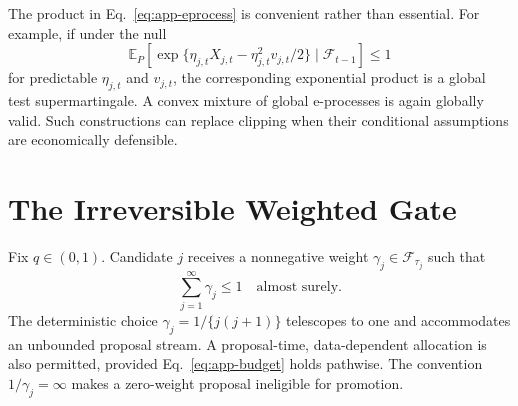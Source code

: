 The product in Eq.~\eqref{eq:app-eprocess} is convenient rather than
essential.  For example, if under the null
\[
 \mathbb E_P[
   \exp\{\eta_{j,t}X_{j,t}-\eta_{j,t}^2v_{j,t}/2\}
   \mid\mathcal F_{t-1}]\leq1
\]
for predictable \(\eta_{j,t}\) and \(v_{j,t}\), the corresponding
exponential product is a global test supermartingale.  A convex mixture of
global e-processes is again globally valid.  Such constructions can replace
clipping when their conditional assumptions are economically defensible.

\section{The Irreversible Weighted Gate}
\label{app:gate}

Fix \(q\in(0,1)\).  Candidate \(j\) receives a nonnegative weight
\(\gamma_j\in\mathcal F_{\tau_j}\) such that
\begin{equation}
  \sum_{j=1}^{\infty}\gamma_j\leq1
  \quad\text{almost surely}.
  \label{eq:app-budget}
\end{equation}
The deterministic choice
\(\gamma_j=1/\{j(j+1)\}\) telescopes to one and accommodates an unbounded
proposal stream.  A proposal-time, data-dependent allocation is also
permitted, provided Eq.~\eqref{eq:app-budget} holds pathwise.  The convention
\(1/\gamma_j=\infty\) makes a zero-weight proposal ineligible for promotion.

